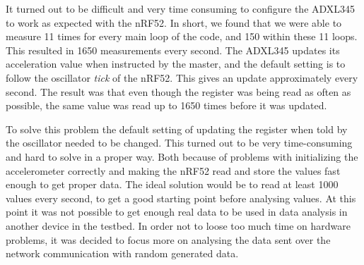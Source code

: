 \noindent It turned out to be difficult and very time consuming to configure the \gls{ADXL345} to work as expected with the \gls{nRF52}. In short, we found that we were able to measure 11 times for every main loop of the code, and 150 within these 11 loops. This resulted in 1650 measurements every second. The \gls{ADXL345} updates its acceleration value when instructed by the master, and the default setting is to follow the oscillator \textit{tick} of the \gls{nRF52}. This gives an update approximately every second.  The result was that even though the register was being read as often as possible, the same value was read up to 1650 times before it was updated.

\noindent To solve this problem the default setting of updating the register when told by the oscillator needed to be changed. This turned out to be very time-consuming and hard to solve in a proper way. Both because of problems with initializing the accelerometer correctly and making the \gls{nRF52} read and store the values fast enough to get proper data. The ideal solution would be to read at least 1000 values every second, to get a good starting point before analysing values. At this point it was not possible to get enough real data to be used in data analysis in another device in the testbed. In order not to loose too much time on hardware problems, it was decided to focus more on analysing the data sent over the network communication with random generated data. 



